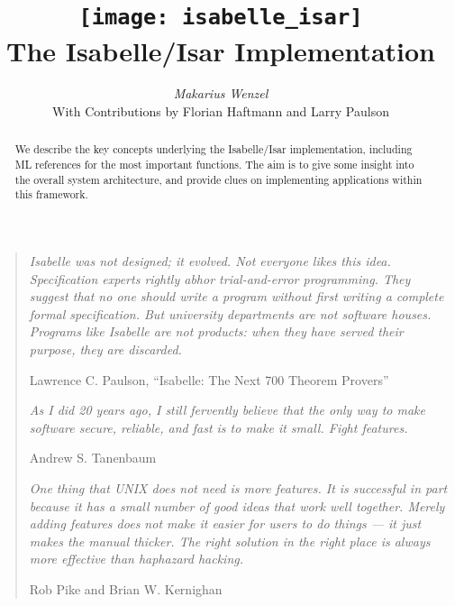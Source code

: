 \documentclass[12pt,a4paper,fleqn]{report}
\title{\texttt{[image: isabelle\_isar]}
  \\[4ex] The Isabelle/Isar Implementation}
\author{\emph{Makarius Wenzel}  \\[3ex]
  With Contributions by
  Florian Haftmann
  and Larry Paulson
}
\begin{document}
\maketitle

\begin{abstract}
  We describe the key concepts underlying the Isabelle/Isar
  implementation, including ML references for the most important
  functions.  The aim is to give some insight into the overall system
  architecture, and provide clues on implementing applications within
  this framework.
\end{abstract}

\vspace*{2.5cm}
\begin{quote}

  {\small\em Isabelle was not designed; it evolved.  Not everyone
    likes this idea.  Specification experts rightly abhor
    trial-and-error programming.  They suggest that no one should
    write a program without first writing a complete formal
    specification. But university departments are not software houses.
    Programs like Isabelle are not products: when they have served
    their purpose, they are discarded.}

  Lawrence C. Paulson, ``Isabelle: The Next 700 Theorem Provers''

  \vspace*{1cm}

  {\small\em As I did 20 years ago, I still fervently believe that the
    only way to make software secure, reliable, and fast is to make it
    small.  Fight features.}

  Andrew S. Tanenbaum

  \vspace*{1cm}

  {\small\em One thing that UNIX does not need is more features. It is
    successful in part because it has a small number of good ideas
    that work well together. Merely adding features does not make it
    easier for users to do things --- it just makes the manual
    thicker. The right solution in the right place is always more
    effective than haphazard hacking.}

  Rob Pike and Brian W. Kernighan

\end{quote}

\thispagestyle{empty}\clearpage

\tableofcontents
\listoffigures
\clearfirst

\setcounter{chapter}{-1}











\appendix


\begingroup
\tocentry{\bibname}
 \small\raggedright\frenchspacing

\endgroup

\tocentry{\indexname}
\printindex
\end{document}
